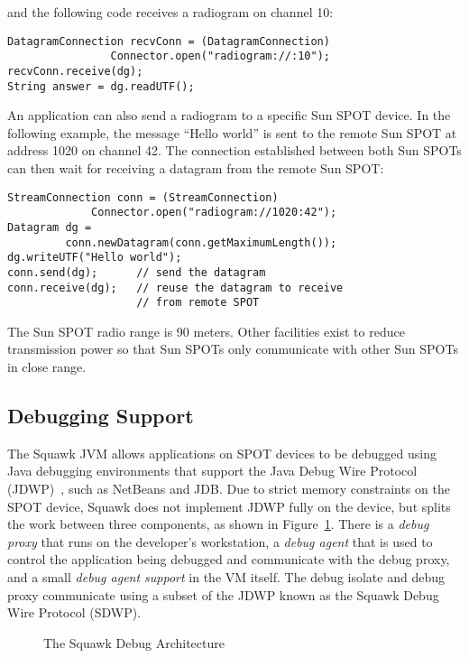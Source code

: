 \documentclass{sigplanconf}
\newcommand{\psfigbegin}[2]{\begin{figure}[htp] \centerline{\psfig{figure={#1},height={#2}}} }
\newcommand{\psfigend}[2]{{\small \bf \caption{\label{#1} {#2}}} \end{figure} }
\begin{document}
and the following code receives a radiogram on channel 10: 

\begin{verbatim}
DatagramConnection recvConn = (DatagramConnection) 
                Connector.open("radiogram://:10");
recvConn.receive(dg);
String answer = dg.readUTF();
\end{verbatim}

An application can also send a radiogram to a specific 
Sun SPOT device. 
In the following example, the message ``Hello world'' is 
sent to the remote Sun SPOT at address 1020 on channel 42.
The connection established between both Sun SPOTs can then 
wait for receiving a datagram from the remote Sun SPOT:

\begin{verbatim}
StreamConnection conn = (StreamConnection)
             Connector.open("radiogram://1020:42");
Datagram dg = 
         conn.newDatagram(conn.getMaximumLength());
dg.writeUTF("Hello world");
conn.send(dg);      // send the datagram
conn.receive(dg);   // reuse the datagram to receive 
                    // from remote SPOT
\end{verbatim}

The Sun SPOT radio range is 90 meters. Other facilities exist to reduce 
transmission power so that Sun SPOTs only communicate with other Sun SPOTs 
in close range.


\subsection{Debugging Support}
\label{sec-debugging}

The Squawk JVM allows applications on SPOT devices to be debugged using Java
debugging environments that support the Java Debug Wire Protocol 
(JDWP)~\cite{JDWP}, such as NetBeans and JDB.
Due to strict memory constraints on the SPOT device, Squawk does
not implement JDWP fully on the device, but splits the work between three
components, as shown in Figure~\ref{fig-debug-arch}.
There is a {\em debug proxy} that runs on the developer's workstation, a
{\em debug agent} that is used to control the application
being debugged and communicate with the debug proxy, and a small
{\em debug agent support} in the VM itself.
The debug isolate and debug proxy communicate using a subset of the JDWP
known as the Squawk Debug Wire Protocol (SDWP).

\psfigbegin{Debugger_img.eps}{6cm}
\psfigend{fig-debug-arch}{The Squawk Debug Architecture}
\end{document}
